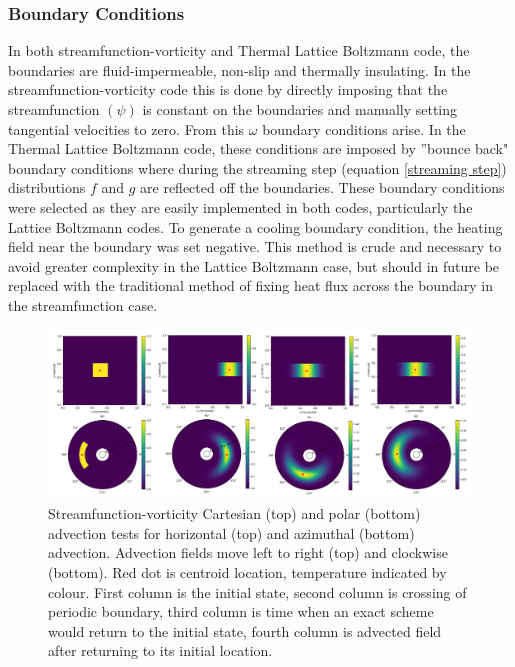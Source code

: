 \documentclass{article}
\begin{document}
\subsubsection*{Boundary Conditions}
\noindent In both streamfunction-vorticity and Thermal Lattice Boltzmann code, the 
boundaries are fluid-impermeable, non-slip and thermally insulating. In the 
streamfunction-vorticity code this is done by directly imposing that the streamfunction $(\psi)$ is constant on the boundaries and manually setting tangential velocities to zero. 
From this $\omega$ boundary conditions arise. In the Thermal Lattice Boltzmann code, these conditions are imposed by ''bounce back" boundary conditions \cite{mora2020concise}
where during the streaming step (equation \ref{streaming step}) distributions $f$ and $g$ are reflected off the boundaries. These boundary conditions 
were selected as they are easily implemented in both codes, particularly the Lattice Boltzmann codes. To generate a cooling boundary condition, the 
heating field near the boundary was set negative. This method is crude and necessary to avoid greater complexity in the Lattice Boltzmann case, but 
should in future be replaced with the traditional method of fixing heat flux across the boundary in the streamfunction case.


\begin{figure}
	\center
	\includegraphics[scale=1.20]{combinedPeriodic.png}
	\caption{Streamfunction-vorticity Cartesian (top) and polar (bottom) advection tests for horizontal (top) and azimuthal (bottom) advection. Advection fields move left to right (top) and clockwise (bottom). Red dot is centroid location, temperature indicated by colour. First column is the initial state, second column is crossing of periodic boundary, third column is time when an exact scheme would return to the initial state, fourth column is advected field after returning to its initial location.}
	\label{periodic advection figure}
\end{figure}
\end{document}
